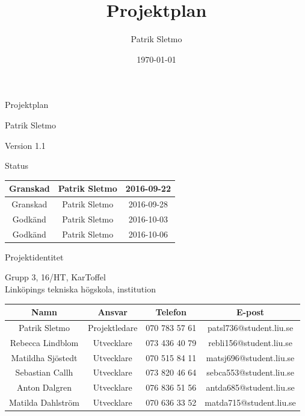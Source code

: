 \documentclass{article}
\title{Projektplan}
\author{Patrik Sletmo}
\date{\today}
\begin{document}
\graphicspath{{./images/}}

\thispagestyle{empty}

{
\sffamily
\centering
\large


{\huge
Projektplan
}

{\large
Patrik Sletmo
}

{\large
Version 1.1
}

\vspace{13.5cm}

Status
\begin{center}
\begin{tabular}{ | c | c | c | }
\hline
Granskad & Patrik Sletmo & 2016-09-22 \\
\hline
Granskad & Patrik Sletmo & 2016-09-28 \\
\hline
Godkänd & Patrik Sletmo & 2016-10-03 \\
\hline
Godkänd & Patrik Sletmo & 2016-10-06 \\
\hline
\end{tabular}
\end{center}
}

\clearpage

\vspace*{\fill}
{
\sffamily
\centering
\large


{\huge
Projektidentitet
}

{\large
Grupp 3, 16/HT, KarToffel \\ Linköpings tekniska högskola, institution
}

\vspace{0.5cm}

\begin{table}[H]
\centering
\begin{tabular}{ | c | c | c | c |}
\hline
Namn & Ansvar & Telefon & E-post \\
\hline
Patrik Sletmo & Projektledare & 070 783 57 61 & patsl736@student.liu.se \\
\hline
Rebecca Lindblom & Utvecklare & 073 436 40 79 & rebli156@student.liu.se \\
\hline
Matildha Sjöstedt & Utvecklare & 070 515 84 11 & matsj696@student.liu.se \\
\hline
Sebastian Callh & Utvecklare & 073 820 46 64 & sebca553@student.liu.se \\
\hline
Anton Dalgren & Utvecklare & 076 836 51 56 & antda685@student.liu.se \\
\hline
Matilda Dahlström & Utvecklare & 070 636 33 52 & matda715@student.liu.se \\
\hline
\end{tabular}
\end{table}
}
\end{document}
